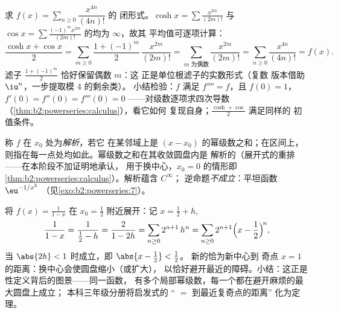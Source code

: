 \begin{example}\label{ex:b2:powerseries:quarter}
求 $f(x) = \sum_{n\geq0} \dfrac{x^{4n}}{(4n)!}$ 的
闭形式。$\cosh x = \sum \frac{x^{2m}}{(2m)!}$ 与 $\cos x =
\sum \frac{(-1)^m x^{2m}}{(2m)!}$ 的均为 $\infty$，故其
平均值可逐项计算：
\[
\frac{\cosh x + \cos x}{2}
= \sum_{m\geq0}\frac{1 + (-1)^m}{2}\,\frac{x^{2m}}{(2m)!}
= \sum_{m \text{ 为偶数}}\frac{x^{2m}}{(2m)!}
= \sum_{n\geq0}\frac{x^{4n}}{(4n)!} = f(x) .
\]
滤子 $\frac{1+(-1)^m}{2}$ 恰好保留偶数 $m$：这
正是单位根滤子的实数形式（复数
版本借助 $\iu^n$，一步提取模 $4$ 的剩余类）。
小结检验：$f$ 满足 $f'''' = f$，且 $f(0) = 1$，
$f'(0) = f''(0) = f'''(0) = 0$ ——对级数逐项求四次导数
（\cref{thm:b2:powerseries:calculus}），看它如何
复现自身；$\frac{\cosh + \cos}{2}$ 满足同样的
初值条件。
\end{example}

\begin{definition}[解析函数]\label{def:b2:powerseries:analytic}
称 $f$ 在 $x_0$ 处为\emph{解析}，若它
在某邻域上是 $(x - x_0)$ 的幂级数之和；在区间上，
则指在每一点处均如此。幂级数之和在其收敛圆盘内是
解析的（展开式的重排——在本阶段不加证明地承认，
用于换中心，$x_0 = 0$ 的情形即
\cref{thm:b2:powerseries:calculus}）。解析蕴含 $C^\infty$；
逆命题\emph{不成立}：平坦函数 $\eu^{-1/x^2}$
（见\cref{exo:b2:powerseries:7}）。
\end{definition}

\begin{example}\label{ex:b2:powerseries:recenter}
将 $f(x) = \frac{1}{1-x}$ 在 $x_0 = \frac12$ 附近展开：记
$x = \frac12 + h$,
\[
\frac{1}{1 - x} = \frac{1}{\frac12 - h}
= \frac{2}{1 - 2h}
= \sum_{n\geq0} 2^{n+1}\,h^n
= \sum_{n\geq0} 2^{n+1}\Bigl(x - \frac12\Bigr)^{\!n},
\]
当 $\abs{2h} < 1$ 时成立，即 $\abs{x - \frac12} < \frac12$。
新的恰为新中心到
奇点 $x = 1$ 的距离：换中心会使圆盘缩小（或扩大），
以恰好避开最近的障碍。小结：这正是
性定义背后的图景——同一函数，
有多个局部幂级数，每一个都在避开麻烦的最大圆盘上成立；
本科三年级分册将启发式的
“ $=$ 到最近复奇点的距离”
化为定理。
\end{example}

